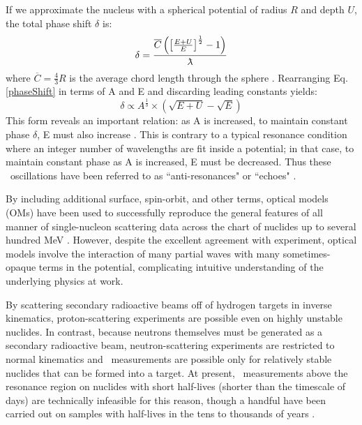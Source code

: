 If we approximate the nucleus with a
spherical potential of radius $R$ and depth $U$, the total phase shift $\delta$ is:
\begin{equation} \label{phaseShift}
    \delta =
    \frac{\overline{C}\left(\left[{\frac{E+U}{E}}\right]^{\frac{1}{2}}-1\right)}{\lambdabar}
\end{equation}
where $\overline{C} = \frac{4}{3}R$ is the average chord length through the
sphere \cite{Angeli1970}. Rearranging Eq. \ref{phaseShift} in terms of A and E and
discarding leading constants yields:
\begin{equation}
    \delta \propto A^{\frac{1}{3}}\times\left(\sqrt{E+U}-\sqrt{E}\right)
\end{equation}
This form reveals an important relation: as A is increased, to maintain constant 
phase $\delta$, E must also increase \cite{Satchler1980, Peterson1962}. 
This is contrary to a typical resonance condition where an integer number of wavelengths
are fit inside a potential; in that case, to maintain constant phase as A is increased,
E must be decreased. Thus these \tot\ oscillations have been referred to as
``anti-resonances" or ``echoes" \cite{Satchler1980, McVoy1967}.

By including additional surface, spin-orbit, and other terms, optical models (OMs) have been 
used to successfully reproduce the general features of all manner of single-nucleon scattering 
data across the chart of nuclides up to several hundred MeV \cite{CH89}. 
However, despite the excellent agreement with experiment, optical models
involve the interaction of many partial waves with many sometimes-opaque terms
in the potential, complicating intuitive understanding of the underlying
physics at work.

By scattering secondary radioactive beams off of hydrogen targets in inverse
kinematics, proton-scattering experiments are possible even on highly unstable
nuclides. In contrast, because neutrons themselves must be generated as a
secondary radioactive beam, neutron-scattering experiments are restricted to
normal kinematics and \tot\ measurements are possible only for relatively stable
nuclides that can be formed into a target. At present, \tot\ measurements above
the resonance region on nuclides with short half-lives (shorter than the timescale of
days) are technically infeasible for this reason, though a handful have been carried out on
samples with half-lives in the tens to thousands of years \cite{Poenitz1983,
Phillips1980, Foster1971}.

